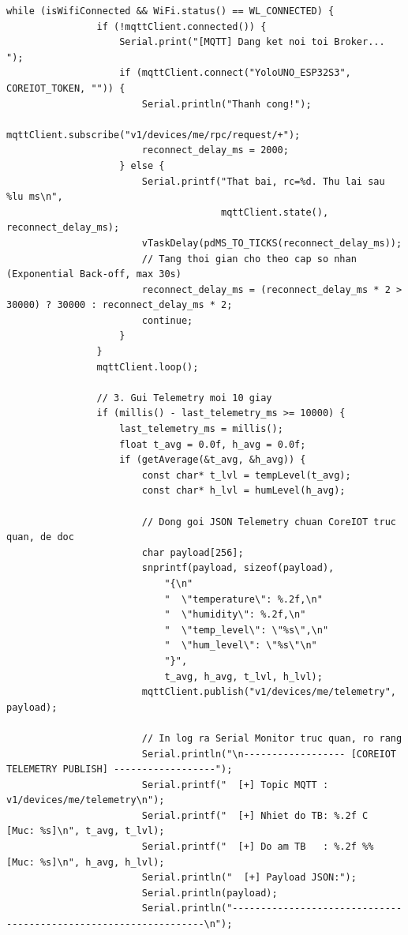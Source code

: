 \begin{lstlisting}[caption={Tác vụ internet\_task xử lý MQTT Telemetry, Báo động và RPC Điều khiển ngược}]
            while (isWifiConnected && WiFi.status() == WL_CONNECTED) {
                if (!mqttClient.connected()) {
                    Serial.print("[MQTT] Dang ket noi toi Broker... ");
                    if (mqttClient.connect("YoloUNO_ESP32S3", COREIOT_TOKEN, "")) {
                        Serial.println("Thanh cong!");
                        mqttClient.subscribe("v1/devices/me/rpc/request/+");
                        reconnect_delay_ms = 2000;
                    } else {
                        Serial.printf("That bai, rc=%d. Thu lai sau %lu ms\n", 
                                      mqttClient.state(), reconnect_delay_ms);
                        vTaskDelay(pdMS_TO_TICKS(reconnect_delay_ms));
                        // Tang thoi gian cho theo cap so nhan (Exponential Back-off, max 30s)
                        reconnect_delay_ms = (reconnect_delay_ms * 2 > 30000) ? 30000 : reconnect_delay_ms * 2;
                        continue;
                    }
                }
                mqttClient.loop();

                // 3. Gui Telemetry moi 10 giay
                if (millis() - last_telemetry_ms >= 10000) {
                    last_telemetry_ms = millis();
                    float t_avg = 0.0f, h_avg = 0.0f;
                    if (getAverage(&t_avg, &h_avg)) {
                        const char* t_lvl = tempLevel(t_avg);
                        const char* h_lvl = humLevel(h_avg);

                        // Dong goi JSON Telemetry chuan CoreIOT truc quan, de doc
                        char payload[256];
                        snprintf(payload, sizeof(payload),
                            "{\n"
                            "  \"temperature\": %.2f,\n"
                            "  \"humidity\": %.2f,\n"
                            "  \"temp_level\": \"%s\",\n"
                            "  \"hum_level\": \"%s\"\n"
                            "}",
                            t_avg, h_avg, t_lvl, h_lvl);
                        mqttClient.publish("v1/devices/me/telemetry", payload);

                        // In log ra Serial Monitor truc quan, ro rang
                        Serial.println("\n------------------ [COREIOT TELEMETRY PUBLISH] ------------------");
                        Serial.printf("  [+] Topic MQTT : v1/devices/me/telemetry\n");
                        Serial.printf("  [+] Nhiet do TB: %.2f C  [Muc: %s]\n", t_avg, t_lvl);
                        Serial.printf("  [+] Do am TB   : %.2f %%  [Muc: %s]\n", h_avg, h_lvl);
                        Serial.println("  [+] Payload JSON:");
                        Serial.println(payload);
                        Serial.println("-----------------------------------------------------------------\n");


\end{lstlisting}
